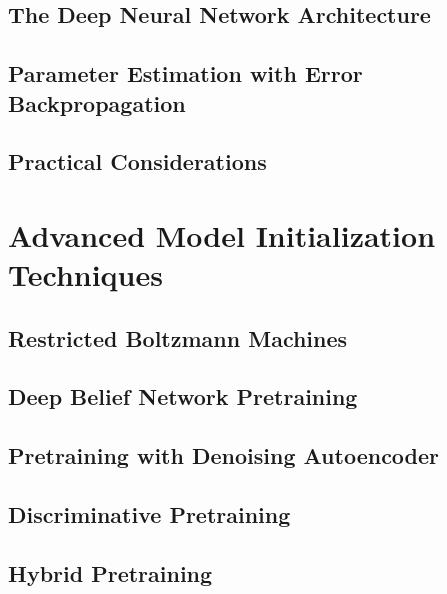 \documentclass[a4paper]{article}
\begin{document}
\subsection{The Deep Neural Network Architecture}

\subsection{Parameter Estimation with Error Backpropagation}

\subsection{Practical Considerations}


\newpage
\section{Advanced Model Initialization Techniques}
\subsection{Restricted Boltzmann Machines}

\subsection{Deep Belief Network Pretraining}

\subsection{Pretraining with Denoising Autoencoder}

\subsection{Discriminative Pretraining}

\subsection{Hybrid Pretraining}
\end{document}
